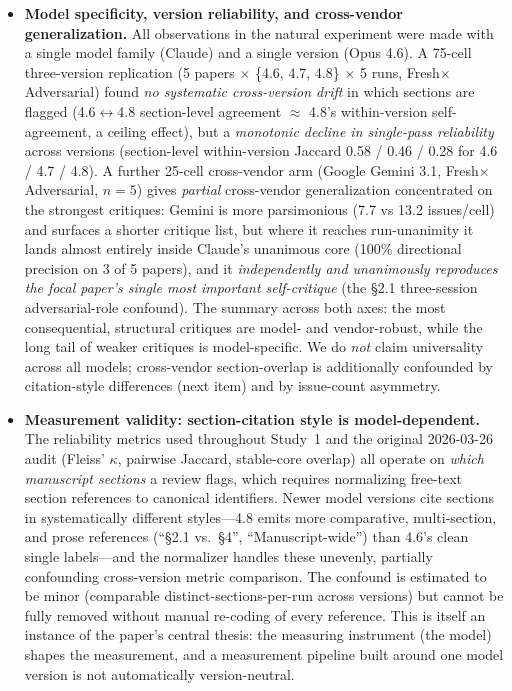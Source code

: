 \documentclass[12pt]{article}
\begin{document}
\begin{itemize}
    \item \textbf{Model specificity, version reliability, and cross-vendor generalization.} All observations in the natural experiment were made with a single model family (Claude) and a single version (Opus 4.6). A 75-cell three-version replication (5 papers $\times$ \{4.6, 4.7, 4.8\} $\times$ 5 runs, Fresh$\times$Adversarial) found \emph{no systematic cross-version drift} in which sections are flagged (4.6$\leftrightarrow$4.8 section-level agreement $\approx$ 4.8's within-version self-agreement, a ceiling effect), but a \emph{monotonic decline in single-pass reliability} across versions (section-level within-version Jaccard 0.58 / 0.46 / 0.28 for 4.6 / 4.7 / 4.8). A further 25-cell cross-vendor arm (Google Gemini 3.1, Fresh$\times$Adversarial, $n=5$) gives \emph{partial} cross-vendor generalization concentrated on the strongest critiques: Gemini is more parsimonious (7.7 vs 13.2 issues/cell) and surfaces a shorter critique list, but where it reaches run-unanimity it lands almost entirely inside Claude's unanimous core (100\% directional precision on 3 of 5 papers), and it \emph{independently and unanimously reproduces the focal paper's single most important self-critique} (the §2.1 three-session adversarial-role confound). The summary across both axes: the most consequential, structural critiques are model- and vendor-robust, while the long tail of weaker critiques is model-specific. We do \emph{not} claim universality across all models; cross-vendor section-overlap is additionally confounded by citation-style differences (next item) and by issue-count asymmetry.

    \item \textbf{Measurement validity: section-citation style is model-dependent.} The reliability metrics used throughout Study~1 and the original 2026-03-26 audit (Fleiss' $\kappa$, pairwise Jaccard, stable-core overlap) all operate on \emph{which manuscript sections} a review flags, which requires normalizing free-text section references to canonical identifiers. Newer model versions cite sections in systematically different styles---4.8 emits more comparative, multi-section, and prose references (``§2.1 vs.\ §4'', ``Manuscript-wide'') than 4.6's clean single labels---and the normalizer handles these unevenly, partially confounding cross-version metric comparison. The confound is estimated to be minor (comparable distinct-sections-per-run across versions) but cannot be fully removed without manual re-coding of every reference. This is itself an instance of the paper's central thesis: the measuring instrument (the model) shapes the measurement, and a measurement pipeline built around one model version is not automatically version-neutral.


\end{itemize}
\end{document}
